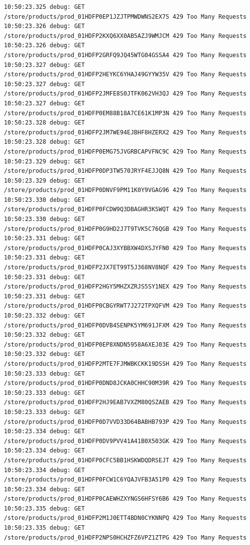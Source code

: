 \begin{listing}[p]
\begin{verbatim}
10:50:23.325 debug: GET /store/products/prod_01HDFP0EP1JZJTPMWDWNS2EX7S 429 Too Many Requests
10:50:23.326 debug: GET /store/products/prod_01HDFP2KXQ6XX0AB5AZJ9WMJCM 429 Too Many Requests
10:50:23.326 debug: GET /store/products/prod_01HDFP2GRFQ9JQ45WTG04GSSA4 429 Too Many Requests
10:50:23.327 debug: GET /store/products/prod_01HDFP2HEYKC6YHAJ49GYYW35V 429 Too Many Requests
10:50:23.327 debug: GET /store/products/prod_01HDFP2JMFE8S0JTFK062VH3QJ 429 Too Many Requests
10:50:23.327 debug: GET /store/products/prod_01HDFP0EM88B18A7CE61K1MP3N 429 Too Many Requests
10:50:23.328 debug: GET /store/products/prod_01HDFP2JM7WE94EJBHF8HZERX2 429 Too Many Requests
10:50:23.328 debug: GET /store/products/prod_01HDFP0EMG75JVGRBCAPVFNC9C 429 Too Many Requests
10:50:23.329 debug: GET /store/products/prod_01HDFP0DP3TW570JRYF4EJJQ8N 429 Too Many Requests
10:50:23.329 debug: GET /store/products/prod_01HDFP0DNVF9PM11K0Y9VGAG96 429 Too Many Requests
10:50:23.330 debug: GET /store/products/prod_01HDFP0FCDW9Q3DBAGHR3KSWQT 429 Too Many Requests
10:50:23.330 debug: GET /store/products/prod_01HDFP0G9HD2J7T9TVK5C76QGB 429 Too Many Requests
10:50:23.331 debug: GET /store/products/prod_01HDFP0CAJ3XYBBXW4DXSJYFN0 429 Too Many Requests
10:50:23.331 debug: GET /store/products/prod_01HDFP2JX7ET99T5J368NV8NQF 429 Too Many Requests
10:50:23.331 debug: GET /store/products/prod_01HDFP2HGY5MHZXZRJS5SY1NEX 429 Too Many Requests
10:50:23.331 debug: GET /store/products/prod_01HDFP0CBGYRWT7J272TPXQFVM 429 Too Many Requests
10:50:23.332 debug: GET /store/products/prod_01HDFP0DVB4SENPK5YM691JFXM 429 Too Many Requests
10:50:23.332 debug: GET /store/products/prod_01HDFP0EP8XNDN5958A6XEJ03E 429 Too Many Requests
10:50:23.332 debug: GET /store/products/prod_01HDFP2MTE7FJMWBKCKK19DSSH 429 Too Many Requests
10:50:23.333 debug: GET /store/products/prod_01HDFP0DND8JCKA0CHHC90M39R 429 Too Many Requests
10:50:23.333 debug: GET /store/products/prod_01HDFP2HJ9EAB7VXZM80QSZAEB 429 Too Many Requests
10:50:23.333 debug: GET /store/products/prod_01HDFP0D7VVD33D64BABHB793P 429 Too Many Requests
10:50:23.334 debug: GET /store/products/prod_01HDFP0DV9PVV41A41B0X503GK 429 Too Many Requests
10:50:23.334 debug: GET /store/products/prod_01HDFP0CFC5BB1HSKWDQDRSEJT 429 Too Many Requests
10:50:23.334 debug: GET /store/products/prod_01HDFP0FCW1C6YQAJVFB3A51P0 429 Too Many Requests
10:50:23.334 debug: GET /store/products/prod_01HDFP0CAEWHZXYNGS6HFSY6B6 429 Too Many Requests
10:50:23.335 debug: GET /store/products/prod_01HDFP2M1J0ETT4BDN0CYKNNPQ 429 Too Many Requests
10:50:23.335 debug: GET /store/products/prod_01HDFP2NPS0HCHZFZ6VPZ1ZTPG 429 Too Many Requests

\end{verbatim}
\end{listing}
